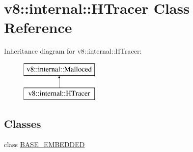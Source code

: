 \hypertarget{classv8_1_1internal_1_1_h_tracer}{}\section{v8\+:\+:internal\+:\+:H\+Tracer Class Reference}
\label{classv8_1_1internal_1_1_h_tracer}
Inheritance diagram for v8\+:\+:internal\+:\+:H\+Tracer\+:\begin{figure}[H]
\begin{center}
\leavevmode
\includegraphics[height=2.000000cm]{classv8_1_1internal_1_1_h_tracer}
\end{center}
\end{figure}
\subsection*{Classes}
\begin{DoxyCompactItemize}
\item 
class \hyperlink{classv8_1_1internal_1_1_h_tracer_1_1_b_a_s_e___e_m_b_e_d_d_e_d}{B\+A\+S\+E\+\_\+\+E\+M\+B\+E\+D\+D\+ED}
\end{DoxyCompactItemize}
